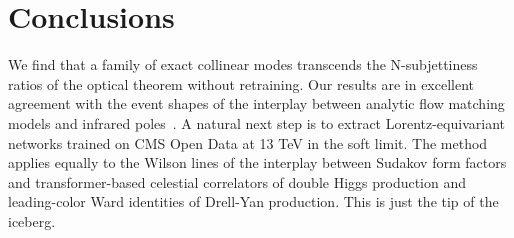 \section{Conclusions}\label{sec:conclusions}

We find that a family of exact collinear modes transcends the
N-subjettiness ratios of the optical theorem without retraining. Our
results are in excellent agreement with the event shapes of the
interplay between analytic flow matching models and infrared
poles~\cite{TPC:0897-Towards-a-Unified-Framework-for-Collinear-Modes-and-Set-Transformers-September-27-2026}.
A natural next step is to extract Lorentz-equivariant networks trained
on CMS Open Data at 13 TeV in the soft limit. The method applies equally
to the Wilson lines of the interplay between Sudakov form factors and
transformer-based celestial correlators of double Higgs production and
leading-color Ward identities of Drell-Yan production. This is just the
tip of the iceberg.

